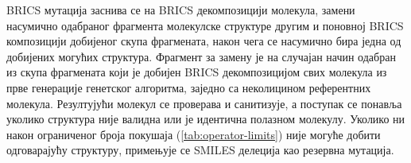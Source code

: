 \documentclass[12pt,oneside]{memoir}
\begin{document}
BRICS мутација заснива се на BRICS декомпозицији молекула, замени 
насумично одабраног фрагмента молекулске структуре другим и
поновној BRICS композицији добијеног скупа фрагмената, након чега се
насумично бира једна од добијених могућих структура.
Фрагмент за замену је на случајан начин одабран из скупа фрагмената 
који је добијен BRICS декомпозицијом свих молекула из прве генерације 
генетског алгоритма, заједно
са неколицином референтних молекула.
Резултујући молекул се проверава и санитизује, 
а поступак се понавља уколико структура није валидна или је идентична 
полазном молекулу. Уколико ни након ограниченог броја покушаја (\ref{tab:operator-limits}) није 
могуће добити одговарајућу структуру, примењује се SMILES делеција 
као резервна мутација.


\begin{table}[!ht]
  \centering
  \footnotesize
  \setlength{\tabcolsep}{3pt}
  \renewcommand{\arraystretch}{1.1}
  \caption{Максималан број покушаја пре одустајања оператора}
  \label{tab:operator-limits}
\end{table}
\end{document}
